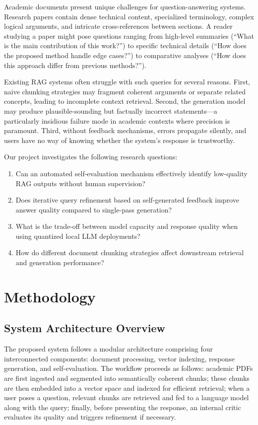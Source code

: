\documentclass[11pt,a4paper]{article}
\begin{document}
Academic documents present unique challenges for question-answering systems. Research papers contain dense technical content, specialized terminology, complex logical arguments, and intricate cross-references between sections. A reader studying a paper might pose questions ranging from high-level summaries (``What is the main contribution of this work?'') to specific technical details (``How does the proposed method handle edge cases?'') to comparative analyses (``How does this approach differ from previous methods?'').

Existing RAG systems often struggle with such queries for several reasons. First, naive chunking strategies may fragment coherent arguments or separate related concepts, leading to incomplete context retrieval. Second, the generation model may produce plausible-sounding but factually incorrect statements—a particularly insidious failure mode in academic contexts where precision is paramount. Third, without feedback mechanisms, errors propagate silently, and users have no way of knowing whether the system's response is trustworthy.

Our project investigates the following research questions:
\begin{enumerate}
    \item Can an automated self-evaluation mechanism effectively identify low-quality RAG outputs without human supervision?
    \item Does iterative query refinement based on self-generated feedback improve answer quality compared to single-pass generation?
    \item What is the trade-off between model capacity and response quality when using quantized local LLM deployments?
    \item How do different document chunking strategies affect downstream retrieval and generation performance?
\end{enumerate}

\section{Methodology}

\subsection{System Architecture Overview}

The proposed system follows a modular architecture comprising four interconnected components: document processing, vector indexing, response generation, and self-evaluation. The workflow proceeds as follows: academic PDFs are first ingested and segmented into semantically coherent chunks; these chunks are then embedded into a vector space and indexed for efficient retrieval; when a user poses a question, relevant chunks are retrieved and fed to a language model along with the query; finally, before presenting the response, an internal critic evaluates its quality and triggers refinement if necessary.
\end{document}
